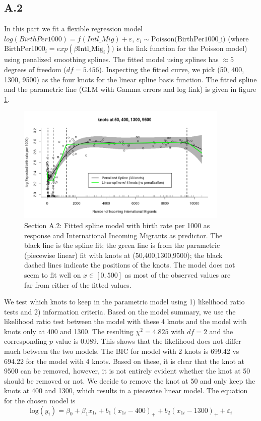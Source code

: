 \documentclass[paper=a4, fontsize=11pt]{scrartcl} %
\numberwithin{equation}{section} %
\begin{document}
\subsection{A.2}

In this part we fit a flexible regression model $log(BirthPer1000) = f(Intl\_Mig) + \varepsilon$, $\varepsilon_i \sim \text{Poisson(BirthPer1000\_i)}$ (where $\text{BirthPer1000}_i = exp(\beta\text{Intl\_Mig}_i))$ is the link function for the Poisson model) using penalized smoothing splines. The fitted model using splines has $\approx 5$ degrees of freedom ($df = 5.456$). Inspecting the fitted curve, we pick (50, 400, 1300, 9500) as the four knots for the linear spline basis function. The fitted spline and the parametric line (GLM with Gamma errors and log link) is given in figure \ref{4knots}.

\begin{figure}[ht]
\centering
\includegraphics[width = 0.9\textwidth]{4knots.png}
\caption{Section A.2: Fitted spline model with birth rate per 1000 as response and International Incoming Migrants as predictor. The black line is the spline fit; the green line is from the parametric (piecewise linear) fit with knots at (50,400,1300,9500); the black dashed lines indicate the positions of the knots. The model does not seem to fit well on $x \in [0, 500]$ as most of the observed values are far from either of the fitted values.}
\label{4knots}
\end{figure}

We test which knots to keep in the parametric model using 1) likelihood ratio tests and 2) information criteria. Based on the model summary, we use the likelihood ratio test between the model with these 4 knots and the model with knots only at 400 and 1300. The resulting $\chi^2 = 4.825$ with $df = 2$ and the corresponding $p$-value is 0.089. This shows that the likelihood does not differ much between the two models. The BIC for model with 2 knots is 699.42 vs 694.22 for the model with 4 knots. Based on these, it is clear that the knot at 9500 can be removed, however, it is not entirely evident whether the knot at 50 should be removed or not. We decide to remove the knot at 50 and only keep the knots at 400 and 1300, which results in a piecewise linear model. The equation for the chosen model is
$$ \text{log}(y_i) = \beta_0 + \beta_1 x_{1i} + b_1(x_{1i} - 400)_+ + b_2(x_{1i} - 1300)_+ + \varepsilon_i $$
\end{document}
